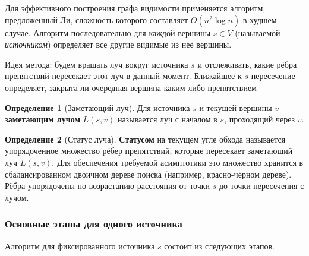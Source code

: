 \documentclass{article}
\theoremstyle{definition}
\newtheorem{definition}{Определение}
\begin{document}
Для эффективного построения графа видимости применяется алгоритм, предложенный Ли,
сложность которого составляет $O(n^2 \log n)$ в худшем случае.
Алгоритм последовательно для каждой вершины $s \in V$ (называемой \emph{источником}) определяет все другие видимые из неё вершины.

Идея метода: будем вращать луч вокруг источника $s$ и отслеживать, какие рёбра препятствий пересекает этот луч в данный момент. 
Ближайшее к $s$ пересечение определяет, закрыта ли очередная вершина каким-либо препятствием

\begin{definition}[Заметающий луч]\label{def:processing_ray}
Для источника $s$ и текущей вершины $v$ \textbf{заметающим лучом} $L(s, v)$ называется луч с началом в $s$, проходящий через $v$.
\end{definition}

\begin{definition}[Статус луча]\label{def:ray_status}
\textbf{Статусом} на текущем угле обхода называется упорядоченное множество рёбер препятствий, которые пересекает заметающий луч $L(s, v)$. 
Для обеспечения требуемой асимптотики это множество хранится в сбалансированном двоичном дереве поиска 
(например, красно-чёрном дереве). Рёбра упорядочены по возрастанию расстояния от точки $s$ до точки пересечения с лучом.
\end{definition}

\subsubsection{Основные этапы для одного источника}

Алгоритм для фиксированного источника $s$ состоит из следующих этапов.
\end{document}
